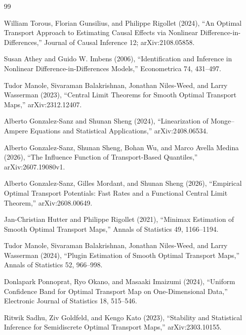 \documentclass{article}
\begin{document}
\begin{thebibliography}{99}

   William Torous, Florian Gunsilius, and Philippe Rigollet (2024), ``An Optimal Transport Approach to Estimating Causal Effects via Nonlinear Difference-in-Differences,'' Journal of Causal Inference 12; arXiv:2108.05858.

   Susan Athey and Guido W. Imbens (2006), ``Identification and Inference in Nonlinear Difference-in-Differences Models,'' Econometrica 74, 431--497.

   Tudor Manole, Sivaraman Balakrishnan, Jonathan Niles-Weed, and Larry Wasserman (2023), ``Central Limit Theorems for Smooth Optimal Transport Maps,'' arXiv:2312.12407.

   Alberto Gonzalez-Sanz and Shunan Sheng (2024), ``Linearization of Monge--Ampere Equations and Statistical Applications,'' arXiv:2408.06534.

   Alberto Gonzalez-Sanz, Shunan Sheng, Bohan Wu, and Marco Avella Medina (2026), ``The Influence Function of Transport-Based Quantiles,'' arXiv:2607.19080v1.

   Alberto Gonzalez-Sanz, Gilles Mordant, and Shunan Sheng (2026), ``Empirical Optimal Transport Potentials: Fast Rates and a Functional Central Limit Theorem,'' arXiv:2608.00649.

   Jan-Christian Hutter and Philippe Rigollet (2021), ``Minimax Estimation of Smooth Optimal Transport Maps,'' Annals of Statistics 49, 1166--1194.

   Tudor Manole, Sivaraman Balakrishnan, Jonathan Niles-Weed, and Larry Wasserman (2024), ``Plugin Estimation of Smooth Optimal Transport Maps,'' Annals of Statistics 52, 966--998.

   Donlapark Ponnoprat, Ryo Okano, and Masaaki Imaizumi (2024), ``Uniform Confidence Band for Optimal Transport Map on One-Dimensional Data,'' Electronic Journal of Statistics 18, 515--546.

   Ritwik Sadhu, Ziv Goldfeld, and Kengo Kato (2023), ``Stability and Statistical Inference for Semidiscrete Optimal Transport Maps,'' arXiv:2303.10155.


\end{thebibliography}
\end{document}
